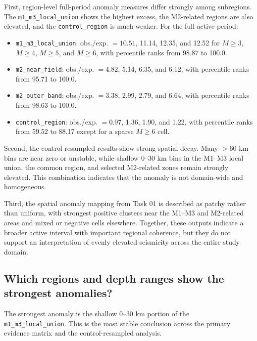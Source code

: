 \documentclass[11pt]{article}
\begin{document}
First, region-level full-period anomaly measures differ strongly among subregions. The \texttt{m1\_m3\_local\_union} shows the highest excess, the M2-related regions are also elevated, and the \texttt{control\_region} is much weaker. For the full active period:
\begin{itemize}[leftmargin=1.5em]
    \item \texttt{m1\_m3\_local\_union}: obs./exp. $= 10.51$, 11.14, 12.35, and 12.52 for $M\geq 3$, $M\geq 4$, $M\geq 5$, and $M\geq 6$, with percentile ranks from 98.87 to 100.0.
    \item \texttt{m2\_near\_field}: obs./exp. $= 4.82$, 5.14, 6.35, and 6.12, with percentile ranks from 95.71 to 100.0.
    \item \texttt{m2\_outer\_band}: obs./exp. $= 3.38$, 2.99, 2.79, and 6.64, with percentile ranks from 98.63 to 100.0.
    \item \texttt{control\_region}: obs./exp. $= 0.97$, 1.36, 1.90, and 1.22, with percentile ranks from 59.52 to 88.17 except for a sparse $M\geq 6$ cell.
\end{itemize}
Second, the control-resampled results show strong spatial decay. Many $>60$ km bins are near zero or unstable, while shallow 0--30 km bins in the M1--M3 local union, the common region, and selected M2-related zones remain strongly elevated. This combination indicates that the anomaly is not domain-wide and homogeneous.

Third, the spatial anomaly mapping from Task 01 is described as patchy rather than uniform, with strongest positive clusters near the M1--M3 and M2-related areas and mixed or negative cells elsewhere. Together, these outputs indicate a broader active interval with important regional coherence, but they do not support an interpretation of evenly elevated seismicity across the entire study domain.

\subsection{Which regions and depth ranges show the strongest anomalies?}
The strongest anomaly is the shallow 0--30 km portion of the \texttt{m1\_m3\_local\_union}. This is the most stable conclusion across the primary evidence matrix and the control-resampled analysis.
\end{document}
